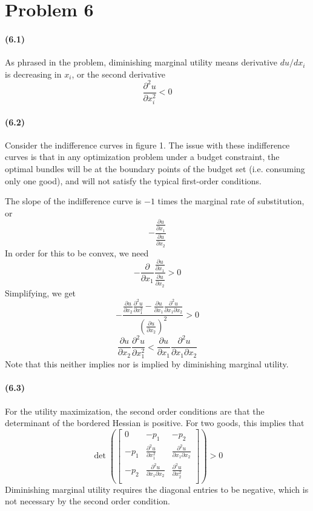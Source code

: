 \documentclass[10pt,letter]{article}
\begin{document}
\section*{Problem 6}
\paragraph{(6.1)}
As phrased in the problem, diminishing marginal utility means derivative $du/dx_i$ is decreasing in $x_i$, or the second derivative
\[ \frac{\partial^2 u}{\partial x_i^2} < 0 \]
\paragraph{(6.2)} Consider the indifference curves in figure 1.
The issue with these indifference curves is that in any optimization problem under a budget constraint, the optimal bundles will be at the boundary points of the budget set (i.e. consuming only one good), and will not satisfy the typical first-order conditions.

The slope of the indifference curve is $-1$ times the marginal rate of substitution, or
\[ - \frac{\frac{\partial u}{\partial x_1}}{\frac{\partial u}{\partial x_2}} \]
In order for this to be convex, we need
 \[ - \frac{\partial}{\partial x_1} \frac{\frac{\partial u}{\partial x_1}}{\frac{\partial u}{\partial x_2}} > 0 \]
 Simplifying, we get
 \[ -  \frac{\frac{\partial u}{\partial x_2}\frac{\partial^2 u}{\partial x_1^2} - \frac{\partial u}{\partial x_1}\frac{\partial^2 u}{\partial x_1 \partial x_2}}{\left( \frac{\partial u}{\partial x_2} \right)^2} > 0 \]
 \[ \frac{\partial u}{\partial x_2}\frac{\partial^2 u}{\partial x_1^2} <  \frac{\partial u}{\partial x_1}\frac{\partial^2 u}{\partial x_1 \partial x_2} \]
 Note that this neither implies nor is implied by diminishing marginal utility.
\paragraph{(6.3)}
For the utility maximization, the second order conditions are that the determinant of the bordered Hessian is positive. For two goods, this implies that
\[ \det \left(\begin{bmatrix}
0 & -p_1 & -p_2 \\
-p_1 & \frac{\partial^2 u}{\partial x_1^2} & \frac{\partial^2 u }{\partial x_1 \partial x_2} \\
-p_2 & \frac{\partial^2 u}{\partial x_1 \partial x_2} & \frac{\partial^2 u}{\partial x_2^2} \\
\end{bmatrix} \right) > 0 \]
Diminishing marginal utility requires the diagonal entries to be negative, which is not necessary by the second order condition.
\end{document}
